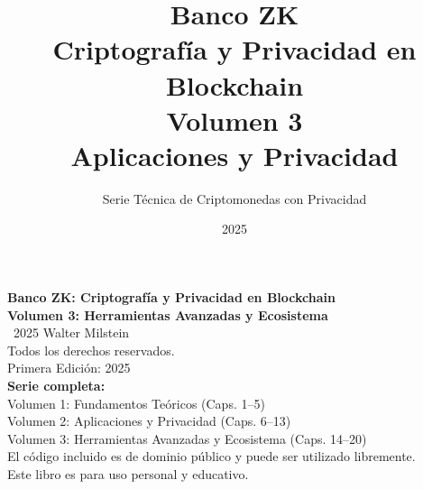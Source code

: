 \documentclass[11pt,a4paper,twoside]{book}
\theoremstyle{definition}
\theoremstyle{remark}
\renewcommand{\cleardoublepage}{\clearpage}
\begin{document}
\thispagestyle{empty}
\null\vfill
\begin{center}
\textbf{Banco ZK: Criptograf\'ia y Privacidad en Blockchain}\\
\textbf{Volumen 3: Herramientas Avanzadas y Ecosistema}\\[1cm]
\textcopyright\ 2025 Walter Milstein\\
Todos los derechos reservados.\\[0.5cm]
Primera Edici\'on: 2025\\[1cm]
\textbf{Serie completa:}\\
Volumen 1: Fundamentos Te\'oricos (Caps. 1--5)\\
Volumen 2: Aplicaciones y Privacidad (Caps. 6--13)\\
Volumen 3: Herramientas Avanzadas y Ecosistema (Caps. 14--20)\\[1cm]
El c\'odigo incluido es de dominio p\'ublico y puede ser utilizado libremente.\\
Este libro es para uso personal y educativo.
\end{center}
\vfill
\cleardoublepage


\title{
    \Huge\textbf{Banco ZK} \\[0.5cm]
    \LARGE Criptografía y Privacidad en Blockchain \\[1cm]
    \huge\textbf{Volumen 3} \\[0.3cm]
    \Large Aplicaciones y Privacidad
}
\author{
    \Large Serie Técnica de Criptomonedas con Privacidad
}
\date{2025}



\maketitle
\end{document}
